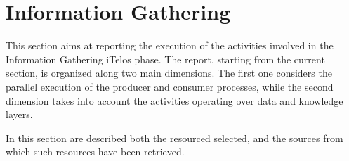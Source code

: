 \section{Information Gathering}

This section aims at reporting the execution of the activities involved in the Information Gathering iTelos phase. The report, starting from the current section, is organized along two main dimensions. The first one considers the parallel execution of the producer and consumer processes, while the second dimension takes into account the activities operating over data and knowledge layers.




\noindent In this section are described both the resourced selected, and the sources from which such resources have been retrieved.\\


